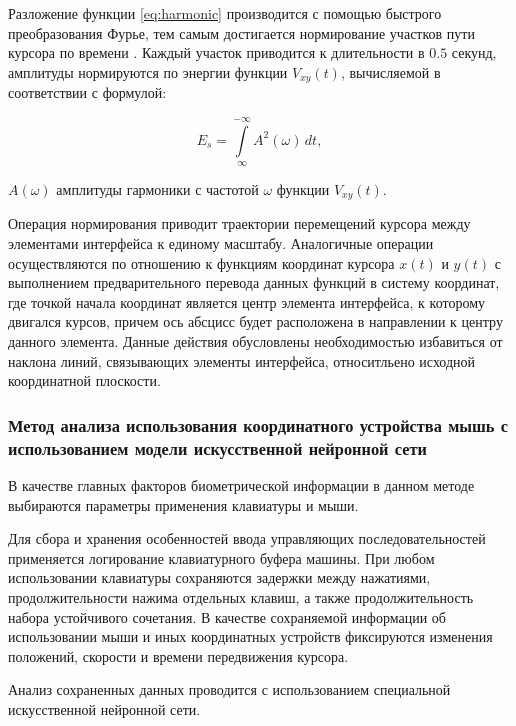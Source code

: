 Разложение функции \eqref{eq:harmonic} производится с помощью быстрого преобразования Фурье, тем самым достигается нормирование участков пути курсора по времени \cite{mouseMethod}. Каждый участок приводится к длительности в $0.5$ секунд, амплитуды нормируются по энергии функции $V_{xy}(t)$, вычисляемой в соответствии с формулой:

\begin{equation}
\label{eq:normir}
E_s = \int\limits_{\infty}^{-\infty} A^2(\omega)\,dt,
\end{equation}
\begin{eqexpl}[15mm]
\item{$A(\omega)$} амплитуды гармоники с частотой $\omega$ функции $V_{xy}(t)$.
\end{eqexpl}

Операция нормирования приводит траектории перемещений курсора между элементами интерфейса к единому масштабу. Аналогичные операции осуществляются по отношению к функциям координат курсора $x(t)$ и $y(t)$ с выполнением предварительного перевода данных функций в систему координат, где точкой начала координат является центр элемента интерфейса, к которому двигался курсов, причем ось абсцисс будет расположена в направлении к центру данного элемента. Данные действия обусловлены необходимостью избавиться от наклона линий, связывающих элементы интерфейса, относитльено исходной координатной плоскости. \cite{mouseMethod}

\subsubsection{Метод анализа использования координатного устройства мышь с использованием модели искусственной нейронной сети}
В качестве главных факторов биометрической информации в данном методе выбираются параметры применения клавиатуры и мыши. \cite{neuroFatigue}

Для сбора и хранения особенностей ввода управляющих последовательностей применяется логирование клавиатурного буфера машины. При любом использовании клавиатуры сохраняются задержки между нажатиями, продолжительности нажима отдельных клавиш, а также продолжительность набора устойчивого сочетания. В качестве сохраняемой информации об использовании мыши и иных координатных устройств фиксируются изменения положений, скорости и времени передвижения курсора. \cite{neuroFatigue}

Анализ сохраненных данных проводится с использованием специальной искусственной нейронной сети. \cite{neuroFatigue}

